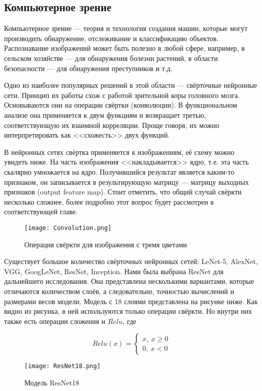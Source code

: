 \subsection{Компьютерное зрение}

Компьютерное зрение --- теория и технология создания машин, которые могут
производить обнаружение, отслеживание и классификацию объектов. Распознавание
изображений может быть полезно в любой сфере, например, в сельском хозяйстве ---
для обнаружения болезни растений, в области безопасности --- для обнаружения
преступников и т.д.

Одно из наиболее популярных решений в этой области --- свёрточные нейронные
сети. Принцип их работы схож с работой зрительной коры головного мозга.
Основываются они на операции свёртки (конволюции). В функциональном анализе
она применяется к двум функциям и возвращает третью, соответствующую их
взаимной корреляции. Проще говоря, их можно интерпретировать как <<схожесть>>
двух функций.

В нейронных сетях свёртка применяется к изображениям, её схему можно увидеть
ниже. На часть изображения <<накладывается>> ядро, т.е. эта часть скалярно
умножается на ядро. Получившийся результат является каким-то признаком, он
записывается в результирующую матрицу --- матрицу выходных признаков
(output feature map). Стоит отметить, что общий случай свёркти несколько
сложнее, более подробно этот вопрос будет рассмотрен в соответствующей
главе.

\begin{figure}[h!]
    \centering
    \texttt{[image: Convolution.png]}
    \caption{Операция свёркти для изображения с тремя цветами}
\end{figure}

Существует большое количество свёрточных нейронных сетей: LeNet-5, AlexNet,
VGG, GoogLeNet, ResNet, Inception. Нами была выбрана ResNet для дальнейшего
исследования. Она представлена несколькими вариантами, которые отличаются
количеством слоёв, а следовательно, точностью вычислений и размерами весов
модели. Модель с 18 слоями представлена на рисунке ниже. Как видно из
рисунка, в ней используются только операции свёркти. Но внутри них также
есть операции сложения и $Relu$, где

\[
    Relu(x) =
        \begin{cases*}
            x, ~ x \geqslant 0 \\
            0, ~ x < 0
        \end{cases*}
\]

\begin{figure}[h!]
    \centering
    \texttt{[image: ResNet18.png]}
    \caption{Модель ResNet18}
\end{figure}

\newpage
